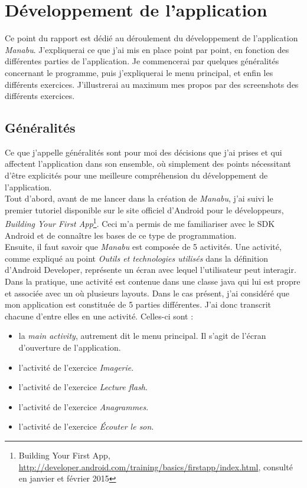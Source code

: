 \section{Développement de l'application}
Ce point du rapport est dédié au déroulement du développement de l'application \textit{Manabu}. J'expliquerai ce que j'ai mis en place point par point, en fonction des différentes parties de l'application. Je commencerai par quelques généralités concernant le programme, puis j'expliquerai le menu principal, et enfin les différents exercices. J'illustrerai au maximum mes propos par des screenshots des différents exercices.

\subsection{Généralités}
Ce que j'appelle généralités sont pour moi des décisions que j'ai prises et qui affectent l'application dans son ensemble, où simplement des points nécessitant d'être explicités pour une meilleure compréhension du développement de l'application.\\

Tout d'abord, avant de me lancer dans la création de \textit{Manabu}, j'ai suivi le premier tutoriel disponible sur le site officiel d'Android pour le développeurs, \textit{Building Your First App}\footnote{Building Your First App, \url{http://developer.android.com/training/basics/firstapp/index.html}, consulté en janvier et février 2015}. Ceci m'a permis de me familiariser avec le SDK Android et de connaître les bases de ce type de programmation.\\

Ensuite, il faut savoir que \textit{Manabu} est composée de 5 activités. Une activité, comme expliqué au point \textit{Outils et technologies utilisés} dans la définition d'Android Developer, représente un écran avec lequel l'utilisateur peut interagir. Dans la pratique, une activité est contenue dans une classe java qui lui est propre et associée avec un où plusieurs layouts. Dans le cas présent, j'ai considéré que mon application est constituée de 5 parties différentes. J'ai donc transcrit chacune d'entre elles en une activité. Celles-ci sont :
\begin{itemize}
\item la \textit{main activity}, autrement dit le menu principal. Il s'agit de l'écran d'ouverture de l'application.
\item l'activité de l'exercice \textit{Imagerie}.
\item l'activité de l'exercice \textit{Lecture flash}.
\item l'activité de l'exercice \textit{Anagrammes}.
\item l'activité de l'exercice \textit{Écouter le son}.\\
\end{itemize}

